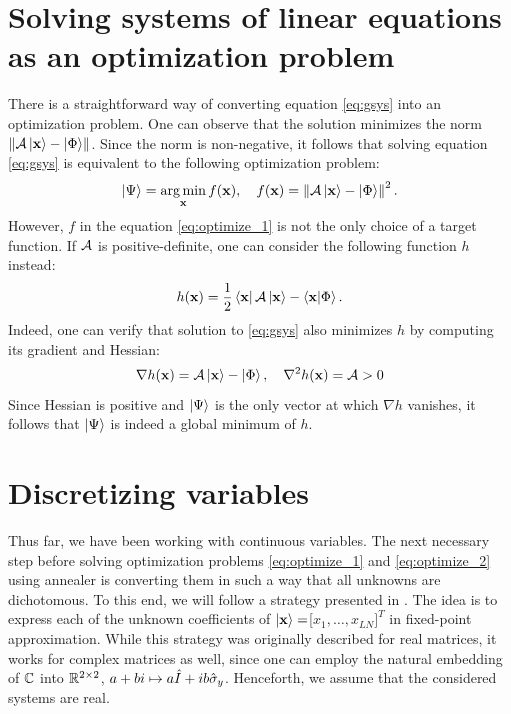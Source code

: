 \section{Solving systems of linear equations as an optimization problem}
There is a straightforward way of converting equation \eqref{eq:gsys} into an
optimization problem. One can observe that the solution minimizes the norm
$\left\Vert \mathcal{A}\ket{\mathbf{x}} - \ket{\Phi}\right\Vert$. Since the
norm is non-negative, it follows that solving equation \eqref{eq:gsys} is
equivalent to the following optimization problem:
\begin{equation}
  \label{eq:optimize_1}
  \ket{\Psi} = \operatorname*{arg\,min}_{\mathbf{x}} f(\mathbf{x}), \quad f({\mathbf x}) = \left\Vert \mathcal{A}\ket{\mathbf{x}} - \ket{\Phi}\right\Vert^2.
\end{equation}
However, $f$ in the equation \eqref{eq:optimize_1} is not the only choice of a
target function. If $\mathcal{A}$ is positive-definite, one can consider the
following function $h$ instead:
\begin{equation}
  \label{eq:optimize_2}
  h(\mathbf{x})=\frac{1}{2}\bra{\mathbf{x}}\mathcal{A}\ket{\mathbf{x}} -
  \braket{\mathbf{x}}{\Phi}.
\end{equation}
Indeed, one can verify that solution to \eqref{eq:gsys} also minimizes $h$ by
computing its gradient and Hessian:
\begin{equation}
  \nabla h(\mathbf{x}) = \mathcal{A}\ket{\mathbf{x}}-\ket{\Phi}, \quad \nabla^2 h({\mathbf
    x})=\mathcal{A}>0
\end{equation}
Since Hessian is positive and $\ket{\Psi}$ is the only vector at which $\nabla
  h$ vanishes, it follows that $\ket{\Psi}$ is indeed a global minimum of $h$.

\section{Discretizing variables}
Thus far, we have been working with continuous variables. The next necessary
step before solving optimization problems \eqref{eq:optimize_1} and
\eqref{eq:optimize_2} using annealer is converting them in such a way that all
unknowns are dichotomous. To this end, we will follow a strategy presented in
\cite{fixedpoint,chang}. The idea is to express each of the unknown
coefficients of $\ket{\mathbf{x}} = $[$x_1, \ldots, x_{LN}]^T$ in fixed-point
approximation. While this strategy was originally described for real matrices,
it works for complex matrices as well, since one can employ the natural embedding of $\mathbb{C}$
into $\mathbb{R}^{2 \times 2}$, $a+bi \mapsto a\hat{I} + ib\hat{\sigma}_{y}$. Henceforth, we assume
that the considered systems are real.

